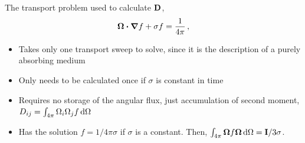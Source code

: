\documentclass{beamer}
\newcommand{\Dtens}{\mat{D}}
\begin{document}
\begin{frame}
  The transport problem used to calculate $\Dtens$,
  \begin{equation*}
    \bm{\Omega}\bm{\cdot} \bm{\nabla} f + \sigma f = \frac{1}{4\pi} \,,
  \end{equation*}
  \vspace{-\baselineskip}
  \begin{itemize}
    \item Takes only one transport sweep to solve, since it is the description
      of a purely absorbing medium
    \item Only needs to be calculated once if $\sigma$ is constant in time
    \item Requires no storage of the angular flux, just accumulation of second
      moment, $D_{ij} = \int_{4\pi} \Omega_i \Omega_j f \mathop{}\!\mathrm{d} \Omega$
    \item Has the solution $f=1/4\pi\sigma$ if $\sigma$ is a constant.
      Then, $\int_{4\pi} \bm{\Omega} f \bm{\Omega} \mathop{}\!\mathrm{d} \Omega =
      \mathbf{I}/3\sigma$.
  \end{itemize}
\end{frame}

\end{document}
